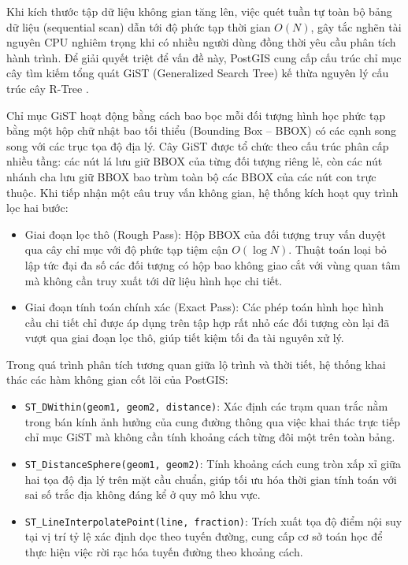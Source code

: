 Khi kích thước tập dữ liệu không gian tăng lên, việc quét tuần tự toàn bộ bảng dữ liệu (sequential scan) dẫn tới độ phức tạp thời gian $O(N)$, gây tắc nghẽn tài nguyên CPU nghiêm trọng khi có nhiều người dùng đồng thời yêu cầu phân tích hành trình. Để giải quyết triệt để vấn đề này, PostGIS cung cấp cấu trúc chỉ mục cây tìm kiếm tổng quát GiST (Generalized Search Tree) kế thừa nguyên lý cấu trúc cây R-Tree \cite{guttman1984}.

Chỉ mục GiST hoạt động bằng cách bao bọc mỗi đối tượng hình học phức tạp bằng một hộp chữ nhật bao tối thiểu (Bounding Box -- BBOX) có các cạnh song song với các trục tọa độ địa lý. Cây GiST được tổ chức theo cấu trúc phân cấp nhiều tầng: các nút lá lưu giữ BBOX của từng đối tượng riêng lẻ, còn các nút nhánh cha lưu giữ BBOX bao trùm toàn bộ các BBOX của các nút con trực thuộc. Khi tiếp nhận một câu truy vấn không gian, hệ thống kích hoạt quy trình lọc hai bước:
\begin{itemize}
    \item[-] Giai đoạn lọc thô (Rough Pass): Hộp BBOX của đối tượng truy vấn duyệt qua cây chỉ mục với độ phức tạp tiệm cận $O(\log N)$. Thuật toán loại bỏ lập tức đại đa số các đối tượng có hộp bao không giao cắt với vùng quan tâm mà không cần truy xuất tới dữ liệu hình học chi tiết.
    \item[-] Giai đoạn tính toán chính xác (Exact Pass): Các phép toán hình học hình cầu chi tiết chỉ được áp dụng trên tập hợp rất nhỏ các đối tượng còn lại đã vượt qua giai đoạn lọc thô, giúp tiết kiệm tối đa tài nguyên xử lý.
\end{itemize}

Trong quá trình phân tích tương quan giữa lộ trình và thời tiết, hệ thống khai thác các hàm không gian cốt lõi của PostGIS:
\begin{itemize}
    \item[-] \texttt{ST\_DWithin(geom1, geom2, distance)}: Xác định các trạm quan trắc nằm trong bán kính ảnh hưởng của cung đường thông qua việc khai thác trực tiếp chỉ mục GiST mà không cần tính khoảng cách từng đôi một trên toàn bảng.
    \item[-] \texttt{ST\_DistanceSphere(geom1, geom2)}: Tính khoảng cách cung tròn xấp xỉ giữa hai tọa độ địa lý trên mặt cầu chuẩn, giúp tối ưu hóa thời gian tính toán với sai số trắc địa không đáng kể ở quy mô khu vực.
    \item[-] \texttt{ST\_LineInterpolatePoint(line, fraction)}: Trích xuất tọa độ điểm nội suy tại vị trí tỷ lệ xác định dọc theo tuyến đường, cung cấp cơ sở toán học để thực hiện việc rời rạc hóa tuyến đường theo khoảng cách.
\end{itemize}

